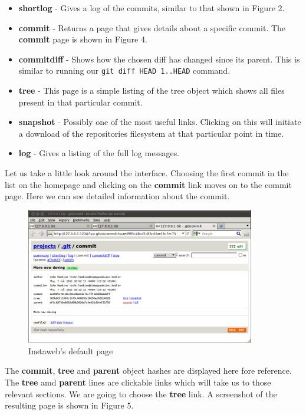 \begin{itemize}
\item {}\textbf{shortlog} - Gives a log of the commits, similar to that shown in Figure 2.
\item {}\textbf{commit} - Returns a page that gives details about a specific commit.
The \textbf{commit} page is shown in Figure 4.
\item {}\textbf{commitdiff} - Shows how the chosen diff has changed since its parent.  
This is similar to running our \texttt{git diff HEAD~1..HEAD} command.
\item {}\textbf{tree} - This page is a simple listing of the tree object which shows all files present in that particular commit.
\item {}\textbf{snapshot} - Possibly one of the most useful links.
Clicking on this will initiate a download of the repositories filesystem at that particular point in time.
\item {}\textbf{log} - Gives a listing of the full log messages.
\end{itemize}

Let us take a little look around the interface.
Choosing the first commit in the list on the homepage and clicking on the \textbf{commit} link moves on to the commit page.
Here we can see detailed information about the commit.

\begin{figure}[hbt]
\centering
\includegraphics[width=10cm]{images/f-af7-d4.png}
\caption{Instaweb's default page}
\end{figure}

The \textbf{commit}, \textbf{tree} and \textbf{parent} object hashes are displayed here fore reference.
The \textbf{tree} amd \textbf{parent} lines are clickable links which will take us to those relevant sections.
We are going to choose the \textbf{tree} link.
A screenshot of the resulting page is shown in Figure 5.

